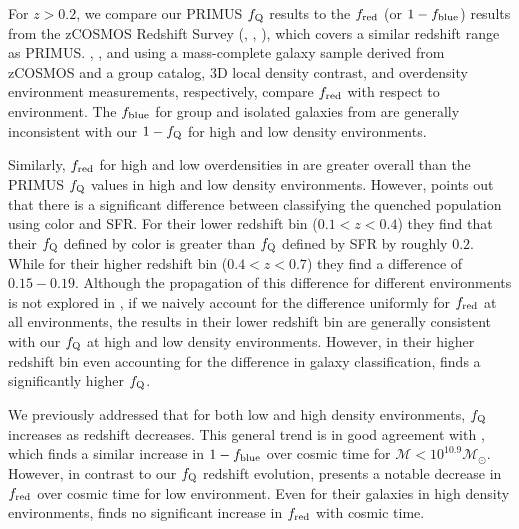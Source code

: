 \documentclass{emulateapj}
\begin{document}
For $z > 0.2$, we compare our PRIMUS $f_{\rm{Q}}$ results to the $f_{\rm{red}}$ (or $1-f_{\rm{blue}}$) results from the zCOSMOS Redshift Survey (\cite{Iovino:2010aa}, \cite{Cucciati:2010aa}, \cite{Kovac:2014aa}), which covers a similar redshift range as PRIMUS. \cite{Iovino:2010aa}, \cite{Cucciati:2010aa}, and \cite{Kovac:2014aa} using a mass-complete galaxy sample derived from zCOSMOS and a group catalog, 3D local density contrast, and overdensity environment measurements, respectively, compare $f_{\rm{red}}$ with respect to environment. The $f_{\rm{blue}}$ for group and isolated galaxies from \cite{Iovino:2010aa} are generally inconsistent with our $1-f_{\rm{Q}}$ for high and low density environments. 

Similarly, $f_{\rm{red}}$ for high and low overdensities in \cite{Kovac:2014aa} are  greater overall than the PRIMUS $f_{\rm{Q}}$ values in high and low density environments. However, \cite{Kovac:2014aa} points out that there is a significant difference between classifying the quenched population using color and SFR. For their lower redshift bin ($0.1 < z < 0.4$) they find that their $f_{\rm{Q}}$ defined by color is greater than $f_{\rm{Q}}$ defined by SFR by roughly $0.2$. While for their higher redshift bin ($0.4 < z < 0.7$) they find a difference of $0.15-0.19$. Although the propagation of this difference for different environments is not explored in \cite{Kovac:2014aa}, if we naively account for the difference uniformly for $f_{\rm{red}}$ at all environments, the \cite{Kovac:2014aa} results in their lower redshift bin are generally consistent with our $f_{\rm{Q}}$ at high and low density environments. However, in their higher redshift bin even accounting for the difference in galaxy classification, \cite{Kovac:2014aa} finds a significantly higher $f_{\rm{Q}}$. 

We previously addressed that for both low and high density environments, $f_{\rm{Q}}$ increases as redshift decreases. This general trend is in good agreement with \cite{Iovino:2010aa}, which finds a similar increase in $1-f_{\rm{blue}}$ over cosmic time for $\mathcal{M} < 10^{10.9} \mathcal{M}_{\odot}$. However, in contrast to our $f_{\rm{Q}}$ redshift evolution, \cite{Kovac:2014aa} presents a notable decrease in $f_{\rm{red}}$ over cosmic time for low environment. Even for their galaxies in high density environments, \cite{Kovac:2014aa} finds no significant increase in $f_{\rm{red}}$ with cosmic time. 
\end{document}

